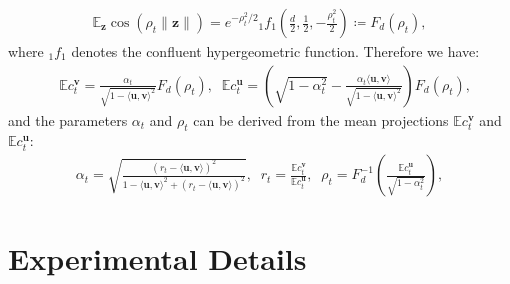 \begin{align}
    \mathbb{E}_{\bm{z}}\cos(\rho_t\|\bm{z}\|) = e^{-\rho_t^2/2} {}_{1}f_1(\frac{d}{2},\frac{1}{2},-\frac{\rho_t^2}{2}) \coloneqq F_d(\rho_t),
\end{align}
where ${}_1f_1$ denotes the confluent hypergeometric function. 
Therefore we have:
\begin{align}
    &\mathbb{E}c^{\bm{v}}_t = \frac{\alpha_t}{\sqrt{1 - \langle \bm{u}, \bm{v}\rangle^2}} F_d(\rho_t), \;\;
    \mathbb{E}c^{\bm{u}}_t = \left(\sqrt{1-\alpha_t^2} - \frac{\alpha_t\langle \bm{u}, \bm{v}\rangle}{\sqrt{1 - \langle \bm{u}, \bm{v}\rangle^2}}\right) F_d(\rho_t),
\end{align}
and the parameters $\alpha_t$ and $\rho_t$ can be derived from the mean projections $\mathbb{E}c_t^{\bm{v}}$ and $\mathbb{E}c_t^{\bm{u}}$:
\begin{align}
\alpha_t = \sqrt{\frac{(r_t - \langle \bm{u}, \bm{v}\rangle)^2}{1 - \langle \bm{u}, \bm{v}\rangle^2 + (r_t - \langle \bm{u}, \bm{v}\rangle)^2}}, \;\; r_t = \frac{\mathbb{E}c_t^{\bm{v}}}{\mathbb{E}c_t^{\bm{u}}}, \;\; \rho_t = F_d^{-1}\left(
    \frac{\mathbb{E}c^{\bm{u}}_t}{\sqrt{1 - \alpha_t^2}}\right),
\end{align}






\section{Experimental Details \label{app:exp}}



